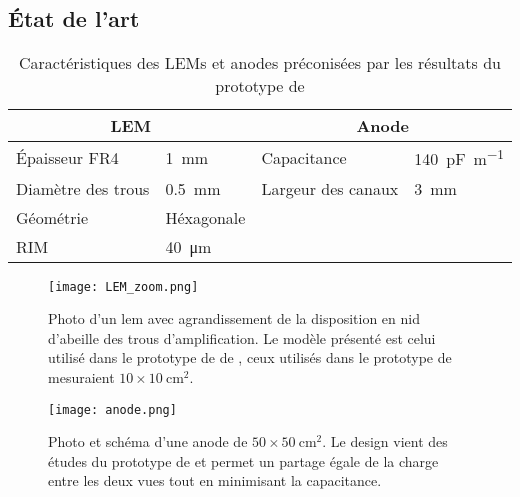     \subsection{État de l'art}\label{sec::state_of_the_art}

      \begin{table}[]
        \centering
        \begin{tabular}{|ll||ll|}
          \hline
          \multicolumn{2}{|c||}{LEM} & \multicolumn{2}{c|}{Anode} \\ \hline \hline
          Épaisseur FR4 & \SI{1}{\milli\meter} & Capacitance & \SI{140}{\pico\farad\per\meter} \\
          Diamètre des trous & \SI{0.5}{\milli\meter} & Largeur des canaux & \SI{3}{\milli\meter} \\
          Géométrie & Héxagonale &  &  \\
          RIM & \SI{40}{\micro\meter} &  &  \\ \hline
        \end{tabular}
        \caption[Caractéristiques des LEMs et anodes utilisé dans le \threeL{}]{\label{tab::lem_anode}Caractéristiques des LEMs et anodes préconisées par les résultats du prototype de \threeL{}}
      \end{table}

      \begin{figure}[htbp]
        \begin{center}\texttt{[image: LEM\_zoom.png]}\end{center}
        \caption[Photo d'un amplificateur d'électron.]{Photo d'un \gls{lem} avec agrandissement de la disposition en nid d'abeille des trous d'amplification. Le modèle présenté est celui utilisé dans le prototype de \TOO{} de \protodp{}, ceux utilisés dans le prototype de \threeL{} mesuraient $10\times\SI{10}{\centi\meter\squared}$.}
        \label{fig::lem}
      \end{figure}

      \begin{figure}[htbp]
        \begin{center}\texttt{[image: anode.png]}\end{center}
        \caption[Photo et schéma d'une anode.]{Photo et schéma d'une anode de $50\times\SI{50}{\centi\meter\squared}$. Le design vient des études du prototype de \threeL{}\cite{Wu2017,Cantini2013} et permet un partage égale de la charge entre les deux vues tout en minimisant la capacitance.}
        \label{fig::anode}
      \end{figure}

